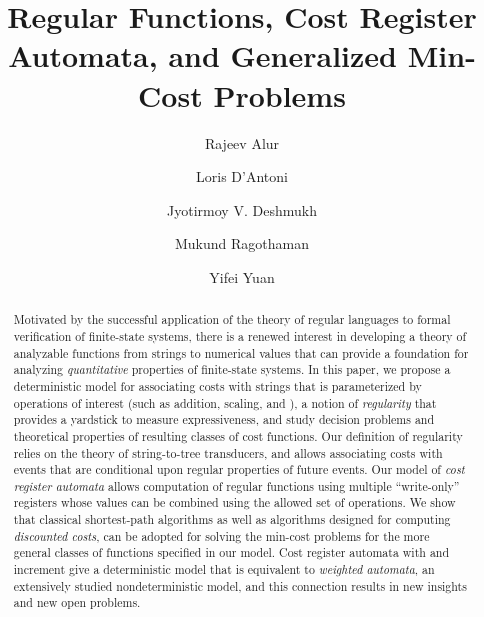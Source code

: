 \documentclass[11pt]{article}
\begin{document}
\thispagestyle{empty}
\begin{titlepage}

\title{Regular Functions, Cost Register Automata, and Generalized Min-Cost Problems}

\author{
Rajeev Alur \and
Loris D'Antoni \and
Jyotirmoy V. Deshmukh \and
Mukund Ragothaman \and
Yifei Yuan
}



\maketitle
\thispagestyle{empty}

\begin{abstract}
Motivated by the successful application of the theory of regular
languages to formal verification of finite-state systems, there is a
renewed interest in developing a theory of analyzable functions from
strings to numerical values that can provide a foundation for
analyzing {\em quantitative\/} properties of finite-state systems.  In
this paper, we propose a deterministic model for associating costs
with strings that is parameterized by operations of interest (such as
addition, scaling, and ), a notion of {\em regularity\/} that
provides a yardstick to measure expressiveness, and study decision
problems and theoretical properties of resulting classes of cost
functions.  Our definition of regularity relies on the theory of
string-to-tree transducers, and allows associating costs with events
that are conditional upon regular properties of future events.  Our
model of {\em cost register automata\/} allows computation of regular
functions using multiple ``write-only'' registers whose values can be
combined using the allowed set of operations.  We show that classical
shortest-path algorithms as well as algorithms designed for computing
{\em discounted costs\/}, can be adopted for solving the min-cost
problems for the more general classes of functions specified in our
model.  Cost register automata with  and increment give a
deterministic model that is equivalent to {\em weighted automata\/},
an extensively studied nondeterministic model, and this connection
results in new insights and new open problems.
\end{abstract}

\end{titlepage}
\end{document}
